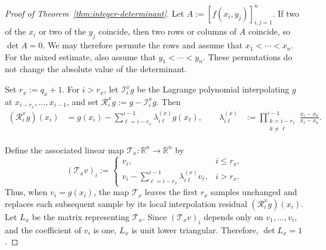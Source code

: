 \documentclass[11pt]{article}
\theoremstyle{definition}
\theoremstyle{remark}
\newcommand{\R}{\mathbb{R}}
\begin{document}
\begin{proof}[Proof of Theorem~\ref{thm:integer-determinant}]
Let $A:=[f(x_i,y_j)]_{i,j=1}^n$.
If two of the $x_i$ or two of the $y_j$ coincide, then two rows or
columns of $A$ coincide, so $\det A=0$. We may therefore permute the
rows and assume that $
    x_1<\cdots<x_n.
$
For the mixed estimate, also assume that $
    y_1<\cdots<y_n.
$
These permutations do not change the absolute value of the determinant.

Set $r_x:=q_x+1$. For $i>r_x$, let $\mathcal I_i^xg$ be the
Lagrange polynomial interpolating $g$ at
$x_{i-r_x},\ldots,x_{i-1}$, and set
$\mathcal R_i^xg:=g-\mathcal I_i^xg$. Then
\[
\begin{aligned}
    (\mathcal R_i^xg)(x_i)
    &=
    g(x_i)
    -
    \sum_{\ell=i-r_x}^{i-1}
    \lambda_{i\ell}^{(x)}g(x_\ell), \qquad
    \lambda_{i\ell}^{(x)}
    &:=
    \prod_{\substack{k=i-r_x\\k\ne\ell}}^{i-1}
    \frac{x_i-x_k}{x_\ell-x_k}.
\end{aligned}
\]

Define the associated linear map $\mathcal T_x:\R^n\to\R^n$ by
\[
    (\mathcal T_xv)_i
    :=
    \begin{cases}
      v_i,
      &i\le r_x,\\[1mm]
      v_i-
      \displaystyle\sum_{\ell=i-r_x}^{i-1}
      \lambda_{i\ell}^{(x)}v_\ell,
      &i>r_x.
    \end{cases}
\]
Thus, when $v_i=g(x_i)$, the map $\mathcal T_x$ leaves the first $r_x$
samples unchanged and replaces each subsequent sample by its local
interpolation residual $(\mathcal R_i^xg)(x_i)$.
Let $L_x$ be the matrix representing $\mathcal T_x$. Since
$(\mathcal T_xv)_i$ depends only on $v_1,\ldots,v_i$, and the coefficient
of $v_i$ is one, $L_x$ is unit lower triangular. Therefore,
$\det L_x=1$.


\end{proof}
\end{document}
